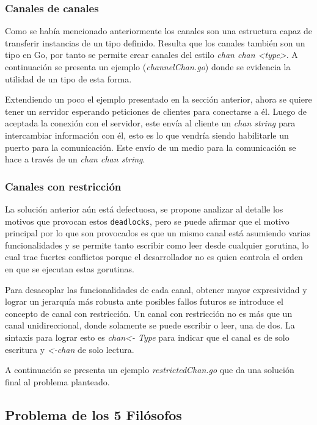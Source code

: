 \documentclass[10pt]{article} %
\begin{document}
\subsubsection{Canales de canales}

Como se había mencionado anteriormente los canales son una estructura capaz de transferir instancias de un tipo definido. Resulta que los canales también son un tipo en Go, por tanto se permite crear canales del estilo \emph{chan chan <type>}. A continuación se presenta un ejemplo (\textit{channelChan.go}) donde se evidencia la utilidad de un tipo de esta forma.

Extendiendo un poco el ejemplo presentado en la sección anterior, ahora se quiere tener un servidor esperando peticiones de clientes para conectarse a él. Luego de aceptada la conexión con el servidor, este envía al cliente un \emph{chan string} para intercambiar información con él, esto es lo que vendría siendo habilitarle un puerto para la comunicación. Este envío de un medio para la comunicación se hace a través de un \emph{chan chan string}.

\subsubsection{Canales con restricción}

La solución anterior aún está defectuosa, se propone analizar al detalle los motivos que provocan estos \texttt{deadlocks}, pero se puede afirmar que el motivo principal por lo que son provocados es que un mismo canal está asumiendo varias funcionalidades y se permite tanto escribir como leer desde cualquier gorutina, lo cual trae fuertes conflictos porque el desarrollador no es quien controla el orden en que se ejecutan estas gorutinas. 

Para desacoplar las funcionalidades de cada canal, obtener mayor expresividad y lograr un jerarquía más robusta ante posibles fallos futuros se introduce el concepto de canal con restricción. Un canal con restricción no es más que un canal unidireccional, donde solamente se puede escribir o leer, una de dos. La sintaxis para lograr esto es \textit{chan<- Type} para indicar que el canal es de solo escritura y \textit{<-chan} de solo lectura.

A continuación se presenta un ejemplo \textit{restrictedChan.go} que da una solución final al problema planteado.

\subsection{Problema de los 5 Fil\'osofos}
\end{document}
